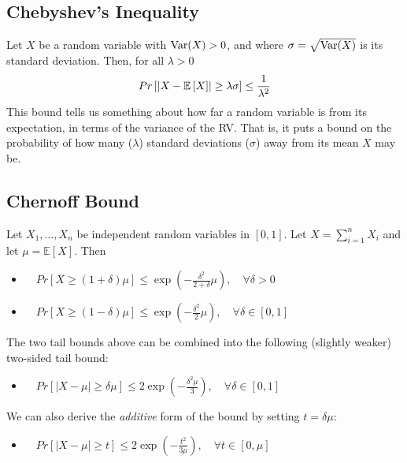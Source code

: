 \documentclass[10pt,a4paper]{article}
\begin{document}
\subsection*{Chebyshev's Inequality}

Let $X$ be a random variable with $\text{Var}(X) > 0$, and where $\sigma = \sqrt{\text{Var}(X)}$ is its standard deviation. Then, for all $\lambda > 0$
\begin{align*}
    Pr \left[ \left| X - \mathbb{E}\left[X\right] \right| \geq \lambda \sigma \right] \leq \dfrac{1}{\lambda^2}
\end{align*}
This bound tells us something about how far a random variable is from its expectation, in terms of the variance of the RV. That is, it puts a bound on the probability of how many ($\lambda$) standard deviations ($\sigma$) away from its mean $X$ may be.


\subsection*{Chernoff Bound}

Let $X_1,\dots,X_n$ be independent random variables in $[0,1]$. Let $X = \sum_{i=1}^n X_i$ and let $\mu = \mathbb{E}[X]$. Then
\begin{itemize}
    \item {} $\quad 
    Pr[X \geq (1+\delta)\mu] \leq \exp\left({-\tfrac{\delta^2}{2+\delta}\mu}\right), \quad  \forall \delta > 0$
    \item {} $\quad
    Pr[X \geq (1-\delta)\mu] \leq \exp\left({-\tfrac{\delta^2}{2}\mu}\right), \quad  \forall \delta \in [0,1]$
\end{itemize}
The two tail bounds above can be combined into the following (slightly weaker) two-sided tail bound:
\begin{itemize}
    \item {} $\quad 
    Pr[|X-\mu| \geq \delta \mu] \leq 2 \exp\left({-\tfrac{\delta^2 \mu}{3}}\right), \quad  \forall \delta \in [0,1]$
\end{itemize}
We can also derive the \textit{additive} form of the bound by setting $t=\delta \mu$:
\begin{itemize}
    \item {} $\quad 
    Pr[|X-\mu| \geq t] \leq 2 \exp \left( {-\tfrac{t^2}{3 \mu}} \right), \quad  \forall t \in [0,\mu]$
\end{itemize}
\end{document}
